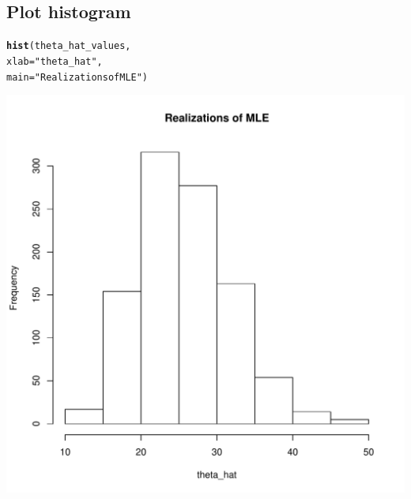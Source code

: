 \documentclass[11pt]{article}\usepackage[]{graphicx}\usepackage[]{color}
\makeatletter
\def\maxwidth{ %
  \ifdim\Gin@nat@width>\linewidth
    \linewidth
  \else
    \Gin@nat@width
  \fi
}
\newcommand{\hlstr}[1]{\textcolor[rgb]{0.192,0.494,0.8}{#1}}%
\newcommand{\hlstd}[1]{\textcolor[rgb]{0.345,0.345,0.345}{#1}}%
\newcommand{\hlkwc}[1]{\textcolor[rgb]{0.333,0.667,0.333}{#1}}%
\newcommand{\hlkwd}[1]{\textcolor[rgb]{0.737,0.353,0.396}{\textbf{#1}}}%
\newenvironment{kframe}{%
 \def\at@end@of@kframe{}%
 \ifinner\ifhmode%
  \def\at@end@of@kframe{\end{minipage}}%
  \begin{minipage}{\columnwidth}%
 \fi\fi%
 \def\FrameCommand##1{\hskip\@totalleftmargin \hskip-\fboxsep
 \colorbox{shadecolor}{##1}\hskip-\fboxsep
     \hskip-\linewidth \hskip-\@totalleftmargin \hskip\columnwidth}%
 \MakeFramed {\advance\hsize-\width
   \@totalleftmargin\z@ \linewidth\hsize
   \@setminipage}}%
 {\par\unskip\endMakeFramed%
 \at@end@of@kframe}
\newenvironment{knitrout}{}{} %
\makeatother
\begin{document}
\subsection{Plot histogram}
\begin{knitrout}
\color{fgcolor}\begin{kframe}
\begin{alltt}
\hlkwd{hist}\hlstd{(theta_hat_values,}
     \hlkwc{xlab} \hlstd{=} \hlstr{"theta_hat"}\hlstd{,}
     \hlkwc{main} \hlstd{=} \hlstr{"Realizations of MLE"}\hlstd{)}
\end{alltt}
\end{kframe}
\includegraphics[width=\maxwidth]{figure/unnamed-chunk-4-1} 

\end{knitrout}
\end{document}
